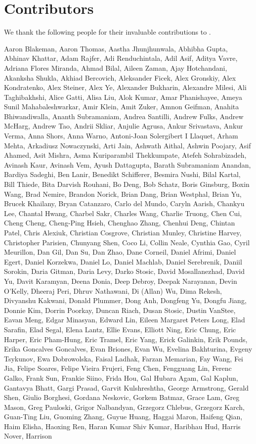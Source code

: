 \section*{Contributors}

We thank the following people for their invaluable contributions to \ourmodelfull.

Aaron Blakeman, Aaron Thomas, Aastha Jhunjhunwala, Abhibha Gupta, Abhinav Khattar, Adam Rajfer, Adi Renduchintala, Adil Asif, Aditya Vavre, Adriana Flores Miranda, Ahmad Bilal, Aileen Zaman, Ajay Hotchandani, Akanksha Shukla, Akhiad Bercovich, Aleksander Ficek, Alex Gronskiy, Alex Kondratenko, Alex Steiner, Alex Ye, Alexander Bukharin, Alexandre Milesi, Ali Taghibakhshi, Alice Gatti, Alisa Liu, Alok Kumar, Amar Phanishayee, Ameya Sunil Mahabaleshwarkar, Amir Klein, Amit Zuker, Amnon Geifman, Anahita Bhiwandiwalla, Ananth Subramaniam, Andrea Santilli, Andrew Fulks, Andrew McHarg, Andrew Tao, Andrii Skliar, Anjulie Agrusa, Ankur Srivastava, Ankur Verma, Anna Shors, Anna Warno, Antoni-Joan Solergibert I Llaquet, Arham Mehta, Arkadiusz Nowaczynski, Arti Jain, Ashwath Aithal, Ashwin Poojary, Asif Ahamed, Asit Mishra, Asma Kuriparambil Thekkumpate, Atefeh Sohrabizadeh, Avinash Kaur, Avinash Vem, Ayush Dattagupta, Barath Subramaniam Anandan, Bardiya Sadeghi, Ben Lanir, Benedikt Schifferer, Besmira Nushi, Bilal Kartal, Bill Thiede, Bita Darvish Rouhani, Bo Deng, Bob Schatz, Boris Ginsburg, Boxin Wang, Brad Nemire, Brandon Norick, Brian Dang, Brian Westphal, Brian Yu, Brucek Khailany, Bryan Catanzaro, Carlo del Mundo, Caryln Aarish, Chankyu Lee, Chantal Hwang, Charbel Sakr, Charles Wang, Charlie Truong, Chen Cui, Cheng Cheng, Cheng-Ping Hsieh, Chenghao Zhang, Chenhui Deng, Chintan Patel, Chris Alexiuk, Christian Cosgrove, Christian Munley, Christine Harvey, Christopher Parisien, Chunyang Shen, Coco Li, Collin Neale, Cynthia Gao, Cyril Meurillon, Dan Gil, Dan Su, Dan Zhao, Dane Corneil, Daniel Afrimi, Daniel Egert, Daniel Korzekwa, Daniel Lo, Daniel Machlab, Daniel Serebrenik, Daniil Sorokin, Daria Gitman, Daria Levy, Darko Stosic, David Mosallanezhad, David Yu, Davit Karamyan, Deena Donia, Deep Debroy, Deepak Narayanan, Devin O’Kelly, Dheeraj Peri, Dhruv Nathawani, Di (Allan) Wu, Dima Rekesh, Divyanshu Kakwani, Donald Plummer, Dong Anh, Dongfeng Yu, Dongfu Jiang, Donnie Kim, Dorrin Poorkay, Duncan Riach, Dusan Stosic, Dustin VanStee, Eavan Meng, Edgar Minasyan, Edward Lin, Eileen Margaret Peters Long, Elad Sarafin, Elad Segal, Elena Lantz, Ellie Evans, Elliott Ning, Eric Chung, Eric Harper, Eric Pham-Hung, Eric Tramel, Eric Yang, Erick Galinkin, Erik Pounds, Erika Goncalves Goncalves, Evan Briones, Evan Wu, Evelina Bakhturina, Evgeny Tsykunov, Ewa Dobrowolska, Faisal Ladhak, Farzan Memarian, Fay Wang, Fei Jia, Felipe Soares, Felipe Vieira Frujeri, Feng Chen, Fengguang Lin, Ferenc Galko, Frank Sun, Frankie Siino, Frida Hou, Gal Hubara Agam, Gal Kaplun, Gantavya Bhatt, Gargi Prasad, Garvit Kulshreshtha, George Armstrong, Gerald Shen, Giulio Borghesi, Gordana Neskovic, Gorkem Batmaz, Grace Lam, Greg Mason, Greg Pauloski, Grigor Nalbandyan, Grzegorz Chlebus, Grzegorz Karch, Guan-Ting Liu, Guoming Zhang, Guyue Huang, Haggai Maron, Haifeng Qian, Haim Elisha, Haoxing Ren, Haran Kumar Shiv Kumar, Haribhau Hud, Harris Nover, Harrison 